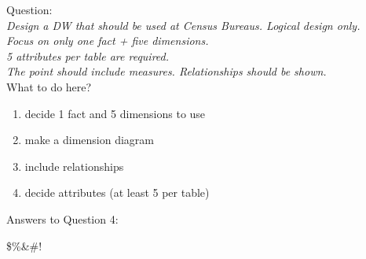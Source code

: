 Question:\\
\emph{
    Design a DW that should be used at Census Bureaus. Logical design only.\\ Focus on only
one fact + five dimensions.\\ 5 attributes per table are required.\\ The point should include
measures. Relationships should be shown.
}\\

What to do here?
\begin{enumerate}
    \item decide 1 fact and 5 dimensions to use
    \item make a dimension diagram
    \item include relationships
    \item decide attributes (at least 5 per table)
  \end{enumerate}

Answers to Question 4:

\$\%\&\#!